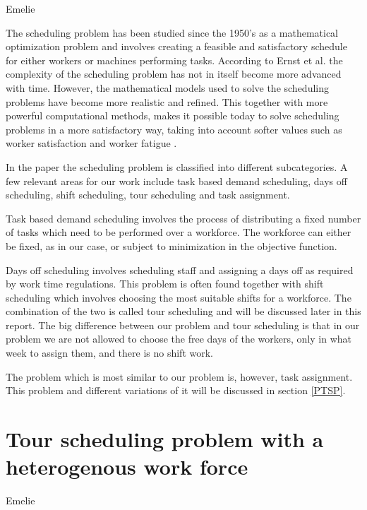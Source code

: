 Emelie

The scheduling problem has been studied since the 1950's as a mathematical optimization problem and involves creating a feasible and satisfactory schedule for either workers or machines performing tasks. According to Ernst et al. the complexity of the scheduling problem has not in itself become more advanced with time. However, the mathematical models used to solve the scheduling problems have become more realistic and refined. This together with more powerful computational methods, makes it possible today to solve scheduling problems in a more satisfactory way, taking into account softer values such as worker satisfaction and worker fatigue \cite{Ernst_2004}.

In the paper \cite{Ernst_2004} the scheduling problem is classified into different subcategories. A few relevant areas for our work include task based demand scheduling, days off scheduling, shift scheduling, tour scheduling and task assignment. 

Task based demand scheduling involves the process of distributing a fixed number of tasks which need to be performed over a workforce. The workforce can either be fixed, as in our case, or subject to minimization in the objective function.
	
Days off scheduling involves scheduling staff and assigning a days off as required by work time regulations. This problem is often found together with shift scheduling which involves choosing the most suitable shifts for a workforce. The combination of the two is called tour scheduling and will be discussed later in this report. The big difference between our problem and tour scheduling is that in our problem we are not allowed to choose the free days of the workers, only in what week to assign them, and there is no shift work.

The problem which is most similar to our problem is, however, task assignment. This problem and different variations of it will be discussed in section \ref{PTSP}.



\section{Tour scheduling problem with a heterogenous work force}\label{TSP}
Emelie

